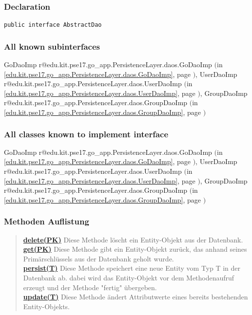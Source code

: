 \documentclass[11pt,a4paper]{article}
\makeatletter
\newcommand{\refdefined}[1]{
\expandafter\ifx\csname r@#1\endcsname\relax
\relax\else
{$($in \ref{#1}, page \pageref{#1}$)$}\fi}
\makeatother
\begin{document}
{{{{{{{\subsubsection{Declaration}{
\begin{lstlisting}[frame=none]
public interface AbstractDao
\end{lstlisting}
\subsubsection{All known subinterfaces}{GoDaoImp\small{\refdefined{edu.kit.pse17.go_app.PersistenceLayer.daos.GoDaoImp}}, UserDaoImp\small{\refdefined{edu.kit.pse17.go_app.PersistenceLayer.daos.UserDaoImp}}, GroupDaoImp\small{\refdefined{edu.kit.pse17.go_app.PersistenceLayer.daos.GroupDaoImp}}}
\subsubsection{All classes known to implement interface}{GoDaoImp\small{\refdefined{edu.kit.pse17.go_app.PersistenceLayer.daos.GoDaoImp}}, UserDaoImp\small{\refdefined{edu.kit.pse17.go_app.PersistenceLayer.daos.UserDaoImp}}, GroupDaoImp\small{\refdefined{edu.kit.pse17.go_app.PersistenceLayer.daos.GroupDaoImp}}}
\subsubsection{Methoden Auflistung}{
\begin{verse}
\hyperlink{edu.kit.pse17.go_app.PersistenceLayer.daos.AbstractDao.delete(PK)}{{\bf delete(PK)}} Diese Methode löscht ein Entity-Objekt aus der Datenbank.\\
\hyperlink{edu.kit.pse17.go_app.PersistenceLayer.daos.AbstractDao.get(PK)}{{\bf get(PK)}} Diese Methode gibt ein Entity-Objekt zurück, das anhand seines Primärschlüssels aus der Datenbank geholt wurde.\\
\hyperlink{edu.kit.pse17.go_app.PersistenceLayer.daos.AbstractDao.persist(T)}{{\bf persist(T)}} Diese Methode speichert eine neue Entity vom Typ T in der Datenbank ab. dabei wird das Entity-Objekt vor dem Methodenaufruf erzeugt und der Methode "fertig" übergeben.\\
\hyperlink{edu.kit.pse17.go_app.PersistenceLayer.daos.AbstractDao.update(T)}{{\bf update(T)}} Diese Methode ändert Attributwerte eines bereits bestehenden Entity-Objekts.\\
\end{verse}
}
}}}}}}}}
\end{document}
